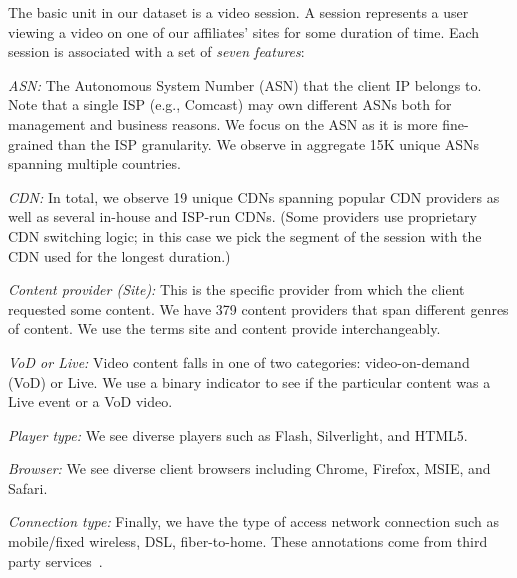 The basic unit in our dataset is a video session. 
A session represents a user viewing a video on one of 
our affiliates' sites for some duration of time.
Each session is associated with a set of \emph{seven 
features}: 
\begin{packedenumerate}
\item \emph{ASN:} The Autonomous System Number 
(ASN) that the client IP belongs  to. 
Note that a single ISP (e.g., Comcast) may own 
different ASNs both  for management and business reasons. 
We focus on the ASN as it is more fine-grained
than the ISP granularity.  We observe in aggregate 
15K unique ASNs spanning multiple countries. 

\item \emph{CDN:}   In total, we observe 19 unique CDNs 
spanning popular CDN providers as well as several in-house 
and ISP-run CDNs. (Some providers use proprietary 
CDN switching logic; in this case we pick the segment of 
the session with the CDN used for the longest
duration.)


\item \emph{Content provider (Site):} This is the specific 
provider from which the client requested some content. 
We have  379 content providers that span different 
genres of content.  We use the terms site and
content provide interchangeably.

\item \emph{VoD or Live:} Video  content  falls in one 
 of two categories: video-on-demand (VoD) or Live.  
 We use a binary indicator to see if the particular
  content was a Live event or a 
 VoD video. 


\item \emph{Player type:} We see diverse  players 
such as  Flash, Silverlight, and HTML5.

\item \emph{Browser:} We see diverse client browsers 
including Chrome, Firefox, MSIE, and Safari. 

\item \emph{Connection type:} Finally, we  have the 
type of access network connection such  as
 mobile/fixed wireless, DSL, fiber-to-home. 
These annotations come from third party services~\cite{quova}.
 
\end{packedenumerate}


